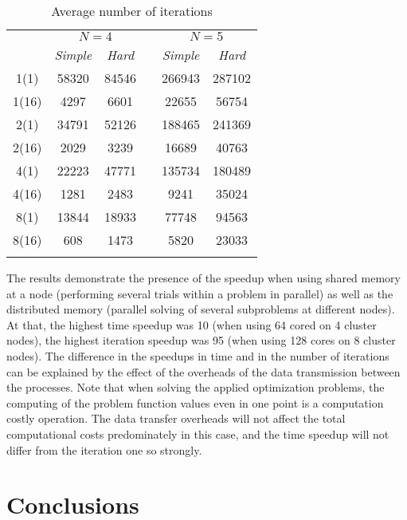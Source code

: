 \documentclass[smallextended]{svjour3}       %
\begin{document}
\begin{table}
	\caption{Average number of iterations}
	\label{tab:2}
	\center
	\begin{tabular}{cccccc}
		\hline\noalign{\smallskip}
		\multirow{2}{*}{\textit{Node(core)}}	 & \multicolumn{2}{c}{ $N=4$ } & & \multicolumn{2}{c}{$N=5$} \\
		\noalign{\smallskip} \cline{2-3} \cline{5-6} \noalign{\smallskip}
		 & \textit{Simple} & \textit{Hard} & & \textit{Simple} & \textit{Hard}  \\
		\noalign{\smallskip} \hline \noalign{\smallskip}
1(1)	&	58320	&	84546	&	&	266943	&	287102	\\
1(16)	&	4297	&	6601	&	&	22655	&	56754	\\
2(1)	&	34791	&	52126	&	&	188465	&	241369	\\
2(16)	&	2029	&	3239	&	&	16689	&	40763	\\
4(1)	&	22223	&	47771	&	&	135734	&	180489	\\
4(16)	&	1281	&	2483	&	&	9241	&	35024	\\
8(1)	&	13844	&	18933	&	&	77748	&	94563	\\
8(16)	&	608	&	1473	&	&	5820	&	23033	\\
		\noalign{\smallskip}\hline
	\end{tabular}
\end{table}


The results demonstrate the presence of the speedup when using shared memory at a node (performing several trials within a problem in parallel) as well as the distributed memory (parallel solving of several subproblems at different nodes). At that, the highest time speedup was 10 (when using 64 cored on 4 cluster nodes), the highest iteration speedup was 95 (when using 128 cores on 8 cluster nodes). The difference in the speedups in time and in the number of iterations can be explained by the effect of the overheads of the data transmission between the processes. Note that when solving the applied optimization problems, the computing of the problem function values even in one point is a computation costly operation. The data transfer overheads will not affect the total computational costs predominately in this case, and the time speedup will not differ from the iteration one so strongly.

\section{Conclusions}
\label{sec:5}
\end{document}
